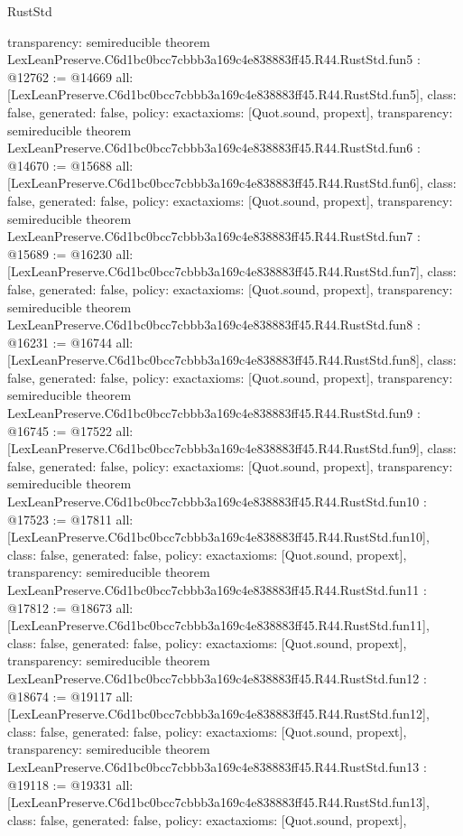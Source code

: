 \begin{lexlean}{RustStd}
\begin{coremodule}
{  transparency: semireducible
}
theorem LexLeanPreserve.C6d1bc0bcc7cbbb3a169c4e838883ff45.R44.RustStd.fun5 : @12762 := @14669 {
  all: [LexLeanPreserve.C6d1bc0bcc7cbbb3a169c4e838883ff45.R44.RustStd.fun5],
  class: false,
  generated: false,
  policy: exact{axioms: [Quot.sound, propext]},
  transparency: semireducible
}
theorem LexLeanPreserve.C6d1bc0bcc7cbbb3a169c4e838883ff45.R44.RustStd.fun6 : @14670 := @15688 {
  all: [LexLeanPreserve.C6d1bc0bcc7cbbb3a169c4e838883ff45.R44.RustStd.fun6],
  class: false,
  generated: false,
  policy: exact{axioms: [Quot.sound, propext]},
  transparency: semireducible
}
theorem LexLeanPreserve.C6d1bc0bcc7cbbb3a169c4e838883ff45.R44.RustStd.fun7 : @15689 := @16230 {
  all: [LexLeanPreserve.C6d1bc0bcc7cbbb3a169c4e838883ff45.R44.RustStd.fun7],
  class: false,
  generated: false,
  policy: exact{axioms: [Quot.sound, propext]},
  transparency: semireducible
}
theorem LexLeanPreserve.C6d1bc0bcc7cbbb3a169c4e838883ff45.R44.RustStd.fun8 : @16231 := @16744 {
  all: [LexLeanPreserve.C6d1bc0bcc7cbbb3a169c4e838883ff45.R44.RustStd.fun8],
  class: false,
  generated: false,
  policy: exact{axioms: [Quot.sound, propext]},
  transparency: semireducible
}
theorem LexLeanPreserve.C6d1bc0bcc7cbbb3a169c4e838883ff45.R44.RustStd.fun9 : @16745 := @17522 {
  all: [LexLeanPreserve.C6d1bc0bcc7cbbb3a169c4e838883ff45.R44.RustStd.fun9],
  class: false,
  generated: false,
  policy: exact{axioms: [Quot.sound, propext]},
  transparency: semireducible
}
theorem LexLeanPreserve.C6d1bc0bcc7cbbb3a169c4e838883ff45.R44.RustStd.fun10 : @17523 := @17811 {
  all: [LexLeanPreserve.C6d1bc0bcc7cbbb3a169c4e838883ff45.R44.RustStd.fun10],
  class: false,
  generated: false,
  policy: exact{axioms: [Quot.sound, propext]},
  transparency: semireducible
}
theorem LexLeanPreserve.C6d1bc0bcc7cbbb3a169c4e838883ff45.R44.RustStd.fun11 : @17812 := @18673 {
  all: [LexLeanPreserve.C6d1bc0bcc7cbbb3a169c4e838883ff45.R44.RustStd.fun11],
  class: false,
  generated: false,
  policy: exact{axioms: [Quot.sound, propext]},
  transparency: semireducible
}
theorem LexLeanPreserve.C6d1bc0bcc7cbbb3a169c4e838883ff45.R44.RustStd.fun12 : @18674 := @19117 {
  all: [LexLeanPreserve.C6d1bc0bcc7cbbb3a169c4e838883ff45.R44.RustStd.fun12],
  class: false,
  generated: false,
  policy: exact{axioms: [Quot.sound, propext]},
  transparency: semireducible
}
theorem LexLeanPreserve.C6d1bc0bcc7cbbb3a169c4e838883ff45.R44.RustStd.fun13 : @19118 := @19331 {
  all: [LexLeanPreserve.C6d1bc0bcc7cbbb3a169c4e838883ff45.R44.RustStd.fun13],
  class: false,
  generated: false,
  policy: exact{axioms: [Quot.sound, propext]},
}
\end{coremodule}
\end{lexlean}
